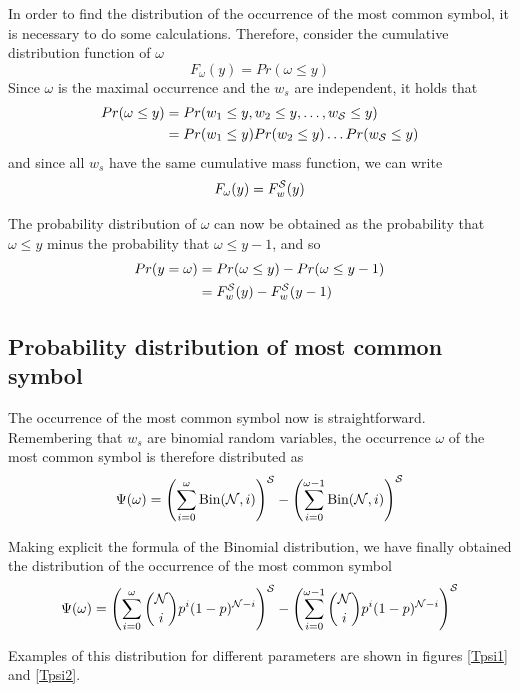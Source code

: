 In order to find the distribution of the occurrence of the most common symbol, it is necessary to do some calculations. Therefore, consider the cumulative distribution function of $\omega$
\[ F_{\omega} (y)= Pr(\omega \leq y) \]
Since $\omega$ is the maximal occurrence and the $w_s$ are independent, it holds that
\begin{align*}
Pr(\omega \leq y) &= Pr(w_1 \leq y, w_2 \leq y, \dots, w_{\mathcal S} \leq y) \\
&= Pr(w_1 \leq y) Pr(w_2 \leq y) \dots Pr(w_{\mathcal S} \leq y)
\end{align*}
and since all $w_s$ have the same cumulative mass function, we can write
\[ F_{\omega} (y) = F_{w}^{\mathcal S} (y) \]

The probability distribution of $\omega$ can now be obtained as the probability that $\omega \leq y$ minus the probability that $\omega \leq y-1$, and so
\begin{align*}
Pr (y = \omega) &= Pr (\omega \leq y) - Pr (\omega \leq y-1) \\
&= F_w^{\mathcal S} (y) - F_w^{\mathcal S} (y-1)
\end{align*}

\subsection{Probability distribution of most common symbol}
The occurrence of the most common symbol now is straightforward. Remembering that $w_s$ are binomial random variables, the occurrence $\omega$ of the most common symbol is therefore distributed as 
\[\Psi (\omega) = \left( \sum_{i=0}^{ \omega} \text{Bin}(\mathcal N, i) \right)^{\mathcal S}- \left( \sum_{i=0}^{\omega -1} \text{Bin}(\mathcal N, i) \right)^{\mathcal S}\]

Making explicit the formula of the Binomial distribution, we have finally obtained the distribution of the occurrence of the most common symbol
\[\Psi (\omega) = \left( \sum_{i=0}^{ \omega} \binom{\mathcal N}{i} p^i (1-p)^{\mathcal N -i} \right) ^{\mathcal S}- \left( \sum_{i=0}^{\omega -1} \binom{\mathcal N}{i} p^i (1-p)^{\mathcal N -i}\right) ^{\mathcal S} \]

Examples of this distribution for different parameters are shown in figures \ref{Tpsi1} and \ref{Tpsi2}.

